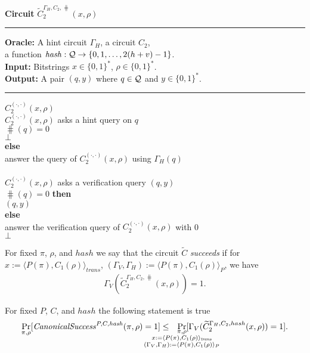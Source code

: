 \begin{codeblock}
  \textbf{Circuit} $\widetilde{C}_2^{\Gamma_H, C_2, \hash} (x, \rho)$
  \medskip \hrule
  \textbf{Oracle:} A hint circuit $\Gamma_H$, a circuit $C_2$, \\ \IndII a function $\operatorname{\mathit{hash}} : \mathcal{Q} \rightarrow \{0,1,\dots, 2(h+v)-1\}$. \\
  \textbf{Input:} Bitstrings $x \in \{0,1\}^{*}$, $\rho \in \{0,1\}^{*}$. \\
  \textbf{Output:} A pair $(q, y)$ where $q \in \mathcal{Q}$ and $y \in \{0,1\}^{*}$.
  \medskip\hrule
  \Run $C_2^{(\cdot, \cdot)}(x, \rho)$ \\
  \IndI \If $C_2^{(\cdot, \cdot)}(x, \rho)$ asks a hint query on $q$ \Then\\
  \IndII \If $\hash(q) = 0$ \Then\\
  \IndIII \Return $\bot$\\
  \IndII \textbf{else}\\
  \IndIII answer the query of $C_2^{(\cdot, \cdot)}(x, \rho)$ using $\Gamma_H(q)$\\
  \\
  \IndI \If $C_2^{(\cdot, \cdot)}(x, \rho)$ asks a verification query $(q, y)$ \Then \\
  \IndII \If $\hash(q) = 0 $ \textbf{then} \\
  \IndIII \Return $(q, y)$ \\
  \IndII \textbf{else} \\
  \IndIII answer the verification query of $C_2^{(\cdot, \cdot)}(x, \rho)$ with 0 \\
  \Return $\bot$
\end{codeblock}
%
For fixed $\pi$, $\rho$, and $hash$ we say that the circuit $\widetilde{C}$ \textit{succeeds} if
for $x := \langle P(\pi), C_1(\rho) \rangle_{\mathit{trans}}$,
$(\Gamma_V, \Gamma_H) := \langle P(\pi), C_1(\rho) \rangle_{P}$, we have
\begin{align*}
\Gamma_V(\widetilde{C}_2^{\Gamma_H, C_2, \hash}(x, \rho)) = 1.
\end{align*}
%
\begin{lemma}
  \label{lemma:ctilda_c}
  For fixed $P$, $C$, and $hash$ the following statement is true
  \begin{align*}
    \underset{\pi, \rho}{\Pr}[\CanonicalSuccess^{P, C, \hash}(\pi, \rho) = 1]
    \leq
    \mkern13mu
    \underset{
      \mathclap{
      \substack{
        \pi, \rho \\
        x := \langle P(\pi), C_1(\rho) \rangle_{\mathit{trans}} \\
        (\Gamma_V, \Gamma_H) := \langle P(\pi), C_1(\rho) \rangle_{P}}}}
  {\Pr}[\Gamma_V(\widetilde{C}_2^{\Gamma_H, C_2, hash}(x, \rho)) = 1].
  \end{align*}
\end{lemma}
